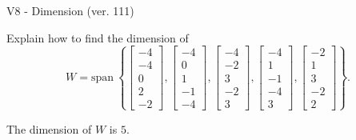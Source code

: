 \begin{exercise}
  \begin{exerciseTitle}V8 - Dimension (ver. 111)\end{exerciseTitle}
  \begin{exerciseStatement}
    Explain how to find the dimension of 
\[W=\mathrm{span}\ \left\{\left[\begin{array}{r}
-4 \\
-4 \\
0 \\
2 \\
-2
\end{array}\right] , \left[\begin{array}{r}
-4 \\
0 \\
1 \\
-1 \\
-4
\end{array}\right] , \left[\begin{array}{r}
-4 \\
-2 \\
3 \\
-2 \\
3
\end{array}\right] , \left[\begin{array}{r}
-4 \\
1 \\
-1 \\
-4 \\
3
\end{array}\right] , \left[\begin{array}{r}
-2 \\
1 \\
3 \\
-2 \\
2
\end{array}\right]\right\}.\]



  \end{exerciseStatement}
  \begin{exerciseAnswer}
   The dimension of \(W\) is  \(5\).
  


  \end{exerciseAnswer}
\end{exercise}